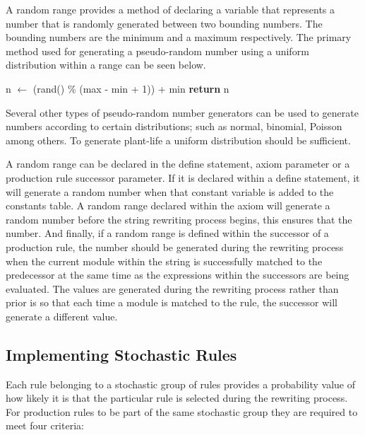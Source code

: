A random range provides a method of declaring a variable that represents a number that is randomly generated between two bounding numbers. The bounding numbers are the minimum and a maximum respectively. The primary method used for generating a pseudo-random number using a uniform distribution within a range can be seen below. 

\begin{singlespace}
\begin{algorithm}
\begin{algorithmic}[1]
	\State n $\gets$ (rand() \% (max - min + 1)) + min
	\State \textbf{return} n
\EndProcedure
\end{algorithmic}
\end{algorithm}
\end{singlespace}

\noindent
Several other types of pseudo-random number generators can be used to generate numbers according to certain distributions; such as normal, binomial, Poisson among others. To generate plant-life a uniform distribution should be sufficient.

A random range can be declared in the define statement, axiom parameter or a production rule successor parameter. If it is declared within a define statement, it will generate a random number when that constant variable is added to the constants table. A random range declared within the axiom will generate a random number before the string rewriting process begins, this ensures that the number. And finally, if a random range is defined within the successor of a production rule, the number should be generated during the rewriting process when the current module within the string is successfully matched to the predecessor at the same time as the expressions within the successors are being evaluated. The values are generated during the rewriting process rather than prior is so that each time a module is matched to the rule, the successor will generate a different value.

\subsection{Implementing Stochastic Rules} \label{stochastic rules}

Each rule belonging to a stochastic group of rules provides a probability value of how likely it is that the particular rule is selected during the rewriting process. For production rules to be part of the same stochastic group they are required to meet four criteria: 

